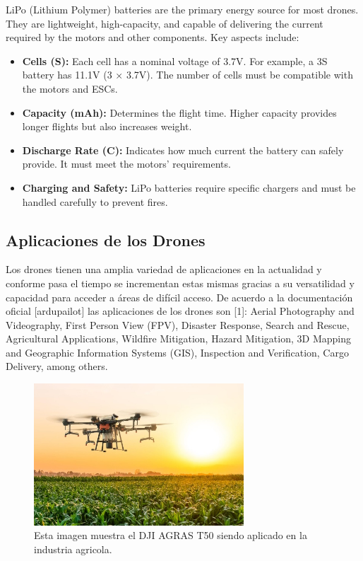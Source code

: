 LiPo (Lithium Polymer) batteries are the primary energy source for most drones. They are lightweight, high-capacity, and capable of delivering the current required by the motors and other components. Key aspects include:

\begin{itemize}
    \item \textbf{Cells (S):} Each cell has a nominal voltage of 3.7V. For example, a 3S battery has 11.1V (3 × 3.7V). The number of cells must be compatible with the motors and ESCs.
    \item \textbf{Capacity (mAh):} Determines the flight time. Higher capacity provides longer flights but also increases weight.
    \item \textbf{Discharge Rate (C):} Indicates how much current the battery can safely provide. It must meet the motors' requirements.
    \item \textbf{Charging and Safety:} LiPo batteries require specific chargers and must be handled carefully to prevent fires.
\end{itemize}

\subsection{Aplicaciones de los Drones}
Los drones tienen una amplia variedad de aplicaciones en la actualidad y conforme pasa el tiempo se incrementan estas mismas gracias a su versatilidad y capacidad para acceder a áreas de difícil acceso. De acuerdo a la documentación oficial [ardupailot] las aplicaciones de los drones son [1]: Aerial Photography and Videography, First Person View (FPV), Disaster Response, Search and Rescue, Agricultural Applications, Wildfire Mitigation, Hazard Mitigation, 3D Mapping and Geographic Information Systems (GIS), Inspection and Verification, Cargo Delivery, among others.

\begin{figure}
    \centering
    \includegraphics[width=0.7\textwidth]{pictures/drone_aplication_1.jpg}
    \caption{Esta imagen muestra el DJI AGRAS T50 siendo aplicado en la industria agricola. \cite{aplications_drones} }
    \label{fig:drone_applications}
\end{figure}

